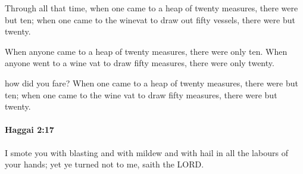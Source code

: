 			\begin{versebox}
					\item[BHS] 
					\item[LXX] 
					\item[ASV] Through all that time, when one came to a heap of twenty measures, there were but ten; when one came to the winevat to draw out fifty vessels, there were but twenty.
					\item[NIV] When anyone came to a heap of twenty measures, there were only ten. When anyone went to a wine vat to draw fifty measures, there were only twenty.
					\item[NRSV] how did you fare? When one came to a heap of twenty measures, there were but ten; when one came to the wine vat to draw fifty measures, there were but twenty.
			\end{versebox}

		\paragraph{Haggai 2:17} %
			\label{HAGGAI-2-17}

			I smote you with blasting and with mildew and with hail in all the labours of your hands; yet ye turned not to me, saith the LORD.

